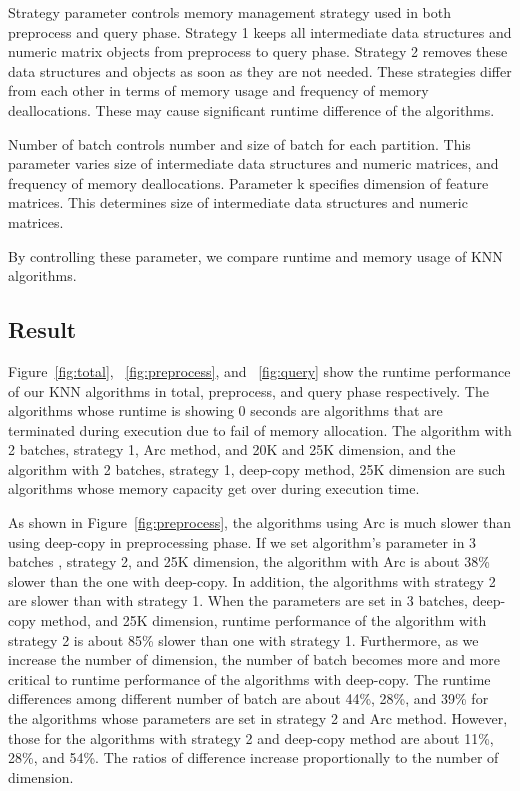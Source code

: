 Strategy parameter controls memory management strategy used in both preprocess and query phase.
Strategy 1 keeps all intermediate data structures and numeric matrix objects from preprocess to query phase. 
Strategy 2 removes these data structures and objects as soon as they are not needed. 
These strategies differ from each other in terms of memory usage and frequency of memory deallocations.
These may cause significant runtime difference of the algorithms.

Number of batch controls number and size of batch for each partition. This parameter varies size of intermediate data structures and numeric matrices, and 
frequency of memory deallocations. Parameter k specifies dimension of feature matrices. This determines size of intermediate data structures and numeric matrices.

By controlling these parameter, we compare runtime and memory usage of KNN algorithms. 


\subsection{Result}
\label{sec:history}
Figure~\ref{fig:total}, ~\ref{fig:preprocess}, and ~\ref{fig:query} show the runtime performance of our KNN algorithms in total, preprocess, and query phase respectively. 
The algorithms whose runtime is showing 0 seconds are algorithms that are terminated during execution due to fail of memory allocation.
The algorithm with 2 batches, strategy 1, Arc method, and 20K and 25K dimension, 
and the algorithm with 2 batches, strategy 1, deep-copy method, 25K dimension are such algorithms whose memory capacity get over during execution time.

As shown in Figure~\ref{fig:preprocess}, the algorithms using Arc is much slower than using deep-copy in preprocessing phase. 
If we set algorithm's parameter in 3 batches , strategy 2, and 25K dimension, the algorithm with Arc is about 38\% slower than the one with deep-copy. 
In addition, the algorithms with strategy 2 are slower than with strategy 1. When the parameters are set in 3 batches, deep-copy method, and 25K dimension, 
runtime performance of the algorithm with strategy 2 is about 85\% slower than one with strategy 1. 
Furthermore, as we increase the number of dimension, the number of batch becomes more and more critical to runtime performance of the algorithms with deep-copy.
The runtime differences among different number of batch are about 44\%, 28\%, and 39\% for the algorithms whose parameters are set in strategy 2 and Arc method. 
However, those for the algorithms with strategy 2 and deep-copy method are about 11\%, 28\%, and 54\%. The ratios of difference increase proportionally to the number of dimension. 



